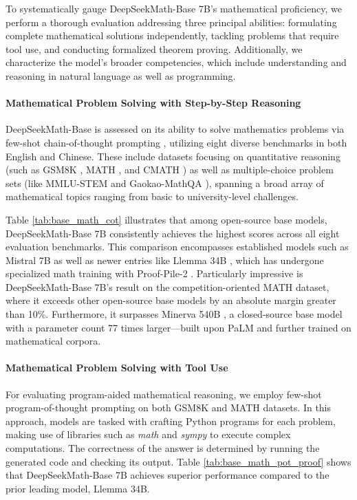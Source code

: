 To systematically gauge DeepSeekMath-Base 7B’s mathematical proficiency, we perform a thorough evaluation addressing three principal abilities: formulating complete mathematical solutions independently, tackling problems that require tool use, and conducting formalized theorem proving. Additionally, we characterize the model’s broader competencies, which include understanding and reasoning in natural language as well as programming.

\paragraph{Mathematical Problem Solving with Step-by-Step Reasoning}

DeepSeekMath-Base is assessed on its ability to solve mathematics problems via few-shot chain-of-thought prompting \citep{cot}, utilizing eight diverse benchmarks in both English and Chinese. These include datasets focusing on quantitative reasoning (such as GSM8K \citep{gsm8k}, MATH \citep{MATH}, and CMATH \citep{wei2023cmath}) as well as multiple-choice problem sets (like MMLU-STEM \citep{mmlu} and Gaokao-MathQA \citep{agieval}), spanning a broad array of mathematical topics ranging from basic to university-level challenges.

Table \ref{tab:base_math_cot} illustrates that among open-source base models, DeepSeekMath-Base 7B consistently achieves the highest scores across all eight evaluation benchmarks. This comparison encompasses established models such as Mistral 7B \citep{mistral} as well as newer entries like Llemma 34B \citep{llemma}, which has undergone specialized math training with Proof-Pile-2 \citep{llemma}. Particularly impressive is DeepSeekMath-Base 7B's result on the competition-oriented MATH dataset, where it exceeds other open-source base models by an absolute margin greater than 10\%. Furthermore, it surpasses Minerva 540B \citep{minerva}, a closed-source base model with a parameter count 77 times larger—built upon PaLM \citep{palm} and further trained on mathematical corpora.

\paragraph{Mathematical Problem Solving with Tool Use} For evaluating program-aided mathematical reasoning, we employ few-shot program-of-thought prompting \citep{pot,pal} on both GSM8K and MATH datasets. In this approach, models are tasked with crafting Python programs for each problem, making use of libraries such as \textit{math} and \textit{sympy} to execute complex computations. The correctness of the answer is determined by running the generated code and checking its output. Table \ref{tab:base_math_pot_proof} shows that DeepSeekMath-Base 7B achieves superior performance compared to the prior leading model, Llemma 34B.


